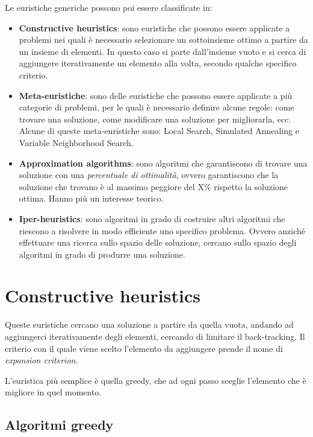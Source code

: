 \noindent Le euristiche generiche possono poi essere classificate in:

\begin{itemize}
	\item \textbf{Constructive heuristics}: sono euristiche che possono essere applicate a problemi nei quali è necessario selezionare un sottoinsieme ottimo a partire da un insieme di elementi. In questo caso si parte dall'insieme vuoto e si cerca di aggiungere iterativamente un elemento alla volta, secondo qualche specifico criterio.
	\item \textbf{Meta-euristiche}: sono delle euristiche che possono essere applicate a più categorie di problemi, per le quali è necessario definire alcune regole: come trovare una soluzione, come modificare una soluzione per migliorarla, ecc. Alcune di queste meta-euristiche sono: Local Search, Simulated Annealing e Variable Neighborhood Search.
	\item \textbf{Approximation algorithms}: sono algoritmi che garantiscono di trovare una soluzione con una \textit{percentuale di ottimalità}, ovvero garantiscono che la soluzione che trovano è al massimo peggiore del X\% rispetto la soluzione ottima. Hanno più un interesse teorico.
	\item \textbf{Iper-heuristics}: sono algoritmi in grado di costruire altri algoritmi che riescono a risolvere in modo efficiente uno specifico problema. Ovvero anziché effettuare una ricerca sullo spazio delle soluzione, cercano sullo spazio degli algoritmi in grado di produrre una soluzione.
\end{itemize}

\section{Constructive heuristics}

Queste euristiche cercano una soluzione a partire da quella vuota, andando ad aggiungerci iterativamente degli elementi, cercando di limitare il back-tracking. Il criterio con il quale viene scelto l'elemento da aggiungere prende il nome di \textit{expansion criterion}.

L'euristica più semplice è quella greedy, che ad ogni passo sceglie l'elemento che è migliore in quel momento.

\subsection{Algoritmi greedy}

